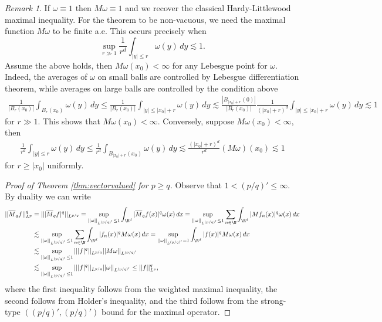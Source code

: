 \documentclass[reqno]{amsart}
\theoremstyle{definition}
\theoremstyle{remark}
\newtheorem*{remark}{Remark}
\begin{document}
\begin{remark}
	If $\omega \equiv 1$ then $M\omega \equiv 1$ and we recover the classical Hardy-Littlewood maximal inequality. For the theorem to be non-vacuous, we need the maximal function $M\omega$ to be finite a.e. This occurs precisely when 
		\[ \sup_{r \gg 1} \frac{1}{r^d} \int_{|y| \leq r} \omega(y) \, dy \lesssim 1. \]
	Assume the above holds, then $M\omega(x_0) < \infty$ for any Lebesgue point for $\omega$. Indeed, the averages of $\omega$ on small balls are controlled by Lebesgue differentiation theorem, while averages on large balls are controlled by the condition above
		\begin{align*}
			\frac{1}{|B_r (x_0)|} \int_{B_r (x_0)} \omega(y) \, dy \leq\frac{1}{|B_r (x_0)|} \int_{|y| \leq |x_0| + r} \omega(y) \, dy \lesssim \frac{|B_{|x_0| + r} (0)|}{|B_r (x_0)|} \frac{1}{(|x_0| + r)^d} \int_{|y| \leq |x_0| + r} \omega(y) \, dy \lesssim 1
		\end{align*}
	for $r \gg 1$. This shows that $M\omega(x_0) < \infty$. Conversely, suppose $M\omega(x_0) < \infty$, then 
	\begin{align*}
		\frac{1}{r^d} \int_{|y| \leq r} \omega(y) \, dy \leq \frac{1}{r^d} \int_{B_{|x_0| + r} (x_0)} \omega(y) \, dy \lesssim \frac{(|x_0| + r)^d}{r^d} (M\omega)(x_0) \lesssim 1
	\end{align*}
	for $r \geq |x_0|$ uniformly. 
\end{remark}

\begin{proof}[Proof of Theorem \ref{thm:vectorvalued} for $p \geq q$]
	Observe that $1 < (p/q)' \leq \infty$. By duality we can write
	\begin{align*}
		||\overline M_q f||_{L^p}^q
			&= || |\overline M_q f|^q ||_{L^{p/q}} = \sup_{||\omega||_{L^{(p/q)'}} \leq 1}\int_{\R^d} |\overline M_q f (x)|^q \omega(x) \, dx =\sup_{||\omega||_{L^{(p/q)'}} \leq 1} \sum_{n \in \N}  \int_{\R^d} |Mf_n (x)|^q \omega(x) \, dx \\
			&\lesssim \sup_{||\omega||_{L^{(p/q)'}} \leq 1} \sum_{n \in \N}  \int_{\R^d} |f_n (x)|^q M \omega(x) \, dx = \sup_{||\omega||_{L^{(p/q)'}} = 1} \int_{\R^d} |f(x)|^q M\omega (x) \, dx \\
			&\lesssim \sup_{||\omega||_{L^{(p/q)'}} \leq 1} || |f|^q||_{L^{p/q}} ||M\omega||_{L^{(p/q)'}} \\
			&\lesssim \sup_{||\omega||_{L^{(p/q)'}} \leq 1} || |f|^q||_{L^{p/q}} ||\omega||_{L^{(p/q)'}} \leq || f||_{L^p}^q,
	\end{align*}
where the first inequality follows from the weighted maximal inequality, the second follows from Holder's inequality, and the third follows from the strong-type $((p/q)', (p/q)')$ bound for the maximal operator. 
\end{proof}




\end{document}
